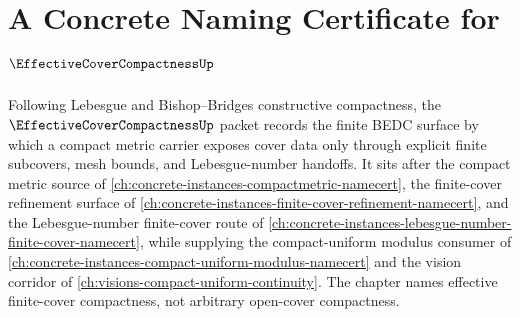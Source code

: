 \chapter{A Concrete Naming Certificate for $\EffectiveCoverCompactnessUp$}
\label{ch:concrete-instances-effective-cover-compactness-namecert}

Following Lebesgue and Bishop--Bridges constructive compactness, the $\EffectiveCoverCompactnessUp$ packet records the finite BEDC surface by which a compact metric carrier exposes cover data only through explicit finite subcovers, mesh bounds, and Lebesgue-number handoffs. It sits after the compact metric source of \autoref{ch:concrete-instances-compactmetric-namecert}, the finite-cover refinement surface of \autoref{ch:concrete-instances-finite-cover-refinement-namecert}, and the Lebesgue-number finite-cover route of \autoref{ch:concrete-instances-lebesgue-number-finite-cover-namecert}, while supplying the compact-uniform modulus consumer of \autoref{ch:concrete-instances-compact-uniform-modulus-namecert} and the vision corridor of \autoref{ch:visions-compact-uniform-continuity}. The chapter names effective finite-cover compactness, not arbitrary open-cover compactness.

